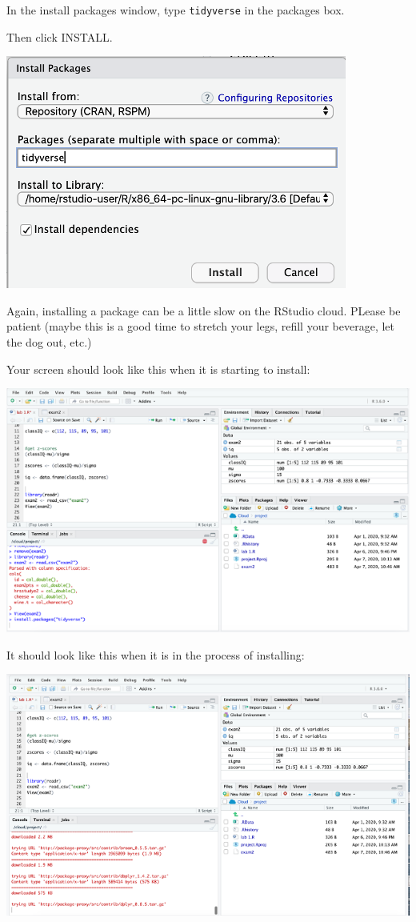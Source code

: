 \documentclass[
]{book}
\begin{document}
In the install packages window, type \texttt{tidyverse} in the packages box.

Then click INSTALL.

\includegraphics{img/instpackguitidy.png}

Again, installing a package can be a little slow on the RStudio cloud. PLease be patient (maybe this is a good time to stretch your legs, refill your beverage, let the dog out, etc.)

Your screen should look like this when it is starting to install:

\includegraphics{img/instload1.png}

It should look like this when it is in the process of installing:

\includegraphics{img/instload2.png}
\end{document}
